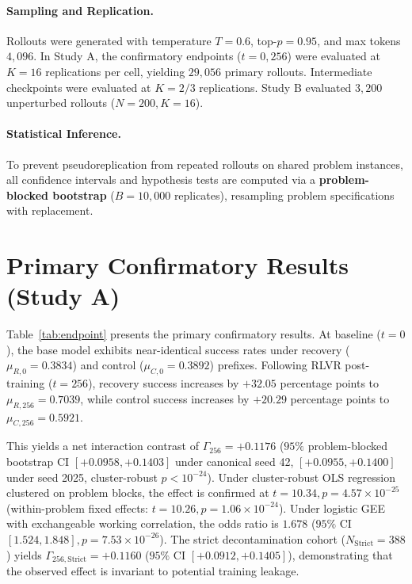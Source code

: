 \documentclass{article}
\begin{document}
\paragraph{Sampling and Replication.}
Rollouts were generated with temperature $T=0.6$, top-$p=0.95$, and max tokens $4,096$. In Study A, the confirmatory endpoints ($t=0, 256$) were evaluated at $K=16$ replications per cell, yielding $29,056$ primary rollouts. Intermediate checkpoints were evaluated at $K=2/3$ replications. Study B evaluated $3,200$ unperturbed rollouts ($N=200, K=16$).

\paragraph{Statistical Inference.}
To prevent pseudoreplication from repeated rollouts on shared problem instances, all confidence intervals and hypothesis tests are computed via a \textbf{problem-blocked bootstrap} ($B=10,000$ replicates), resampling problem specifications with replacement.

\section{Primary Confirmatory Results (Study A)}



Table~\ref{tab:endpoint} presents the primary confirmatory results. At baseline ($t=0$), the base model exhibits near-identical success rates under recovery ($\mu_{R,0} = 0.3834$) and control ($\mu_{C,0} = 0.3892$) prefixes. Following RLVR post-training ($t=256$), recovery success increases by $+32.05$ percentage points to $\mu_{R,256} = 0.7039$, while control success increases by $+20.29$ percentage points to $\mu_{C,256} = 0.5921$.

This yields a net interaction contrast of $\Gamma_{256} = \mathbf{+0.1176}$ ($95\%$ problem-blocked bootstrap CI $[+0.0958, +0.1403]$ under canonical seed 42, $[+0.0955, +0.1400]$ under seed 2025, cluster-robust $p < 10^{-24}$). Under cluster-robust OLS regression clustered on problem blocks, the effect is confirmed at $t=10.34, p = 4.57 \times 10^{-25}$ (within-problem fixed effects: $t=10.26, p = 1.06 \times 10^{-24}$). Under logistic GEE with exchangeable working correlation, the odds ratio is $1.678$ ($95\%$ CI $[1.524, 1.848], p = 7.53 \times 10^{-26}$). The strict decontamination cohort ($N_{\text{Strict}}=388$) yields $\Gamma_{256,\text{Strict}} = \mathbf{+0.1160}$ ($95\%$ CI $[+0.0912, +0.1405]$), demonstrating that the observed effect is invariant to potential training leakage.
\end{document}
